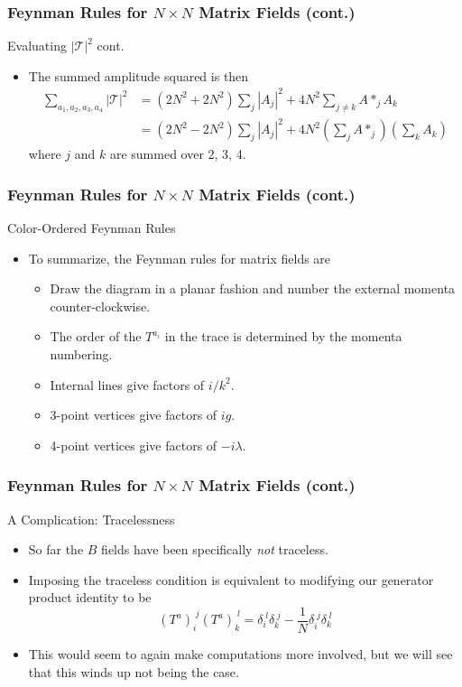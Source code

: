 \documentclass{beamer}
\begin{document}
\begin{frame}
    \frametitle{Feynman Rules for $N\times N$ Matrix Fields (cont.)}
    \alert{Evaluating $|\mathcal{T}|^2$ cont.}
    \begin{itemize}
        \item[\textbullet]<2-> The summed amplitude squared is then
        \begin{align*}
            \sum_{a_1,a_2,a_3,a_4}|\mathcal{T}|^2 &= (2N^2 + 2N^2)\sum_j |A_j|^2 + 4N^2\sum_{j\neq k} A*_jA_k \\
            &= (2N^2 - 2N^2)\sum_j |A_j|^2 + 4N^2\left(\sum_{j} A*_j\right)\left(\sum_k A_k \right)
        \end{align*}
        where $j$ and $k$ are summed over 2, 3, 4.
    \end{itemize}
\end{frame}

\begin{frame}
    \frametitle{Feynman Rules for $N\times N$ Matrix Fields (cont.)}
    \alert{Color-Ordered Feynman Rules}
    \begin{itemize}
        \item[\textbullet]<2-> To summarize, the Feynman rules for matrix fields are
        \begin{itemize}
            \item[1)]<3-> Draw the diagram in a planar fashion and number the external momenta counter-clockwise.
            \item[2)]<4-> The order of the $T^{a_i}$ in the trace is determined by the momenta numbering.
            \item[3)]<5-> Internal lines give factors of $i/k^2$.
            \item[4)]<6-> 3-point vertices give factors of $ig$. 
            \item[5)]<7-> 4-point vertices give factors of $-i\lambda$. 
        \end{itemize}
    \end{itemize}
\end{frame}

\begin{frame}
    \frametitle{Feynman Rules for $N\times N$ Matrix Fields (cont.)}
    \alert{A Complication: Tracelessness}
    \begin{itemize}
        \item[\textbullet]<2-> So far the $B$ fields have been specifically \textit{not} traceless.
        \item[\textbullet]<3-> Imposing the traceless condition is equivalent to modifying our generator product identity to be \[ (T^a)_i^{\;j}(T^a)_k^{\;l} = \delta_i^{\;l}\delta_k^{\;j} - \frac{1}{N}\delta_i^{\;j}\delta_k^{\;l} \]
        \item[\textbullet]<4-> This would seem to again make computations more involved, but we will see that this winds up not being the case.
    \end{itemize}
\end{frame}
\end{document}
